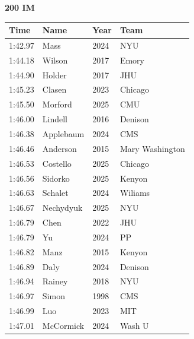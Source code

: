 \noindent\begin{minipage}[t]{0.98\textwidth}
\centering
\textbf{\textcolor{teamprimary}{200 IM}}\par
\vspace{0.5em}
\centering
\small
\renewcommand{\arraystretch}{1.0}
\setlength{\tabcolsep}{4pt}
\begin{tabular}{@{}p{2.5cm}p{4.5cm}p{1.5cm}p{2.5cm}@{}}
\toprule
\textbf{Time} & \textbf{Name} & \textbf{Year} & \textbf{Team} \\
\midrule
1:42.97 & Mass & 2024 & NYU \\
1:44.18 & Wilson & 2017 & Emory \\
1:44.90 & Holder & 2017 & JHU \\
1:45.23 & Clasen & 2023 & Chicago \\
1:45.50 & Morford & 2025 & CMU \\
1:46.00 & Lindell & 2016 & Denison \\
1:46.38 & Applebaum & 2024 & CMS \\
1:46.46 & Anderson & 2015 & Mary Washington \\
1:46.53 & Costello & 2025 & Chicago \\
1:46.56 & Sidorko & 2025 & Kenyon \\
1:46.63 & Schalet & 2024 & Wiliams \\
1:46.67 & Nechydyuk & 2025 & NYU \\
1:46.79 & Chen & 2022 & JHU \\
1:46.79 & Yu & 2024 & PP \\
1:46.82 & Manz & 2015 & Kenyon \\
1:46.89 & Daly & 2024 & Denison \\
1:46.94 & Rainey & 2018 & NYU \\
1:46.97 & Simon & 1998 & CMS \\
1:46.99 & Luo & 2023 & MIT \\
1:47.01 & McCormick & 2024 & Wash U \\
\bottomrule
\end{tabular}
\end{minipage}
\vspace{1.2em}
